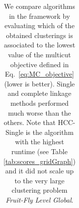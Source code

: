 \begin{table}[t]
\begin{subtable}[t!]{\textwidth}
\begin{tabular}{l | r r r r r r r r r}




        \end{tabular}
    \end{subtable} 
    \caption{We compare algorithms in the \algname{} framework by evaluating which of the obtained clusterings is associated to the lowest value of the multicut objective defined in Eq.~\ref{eq:MC_objective} (lower is better). Single and complete linkage methods performed much worse than the others. Note that HCC-Single is the algorithm with the highest runtime (see Table \ref{tab:scores_gridGraph}) and it did not scale up to the very large clustering problem \emph{Fruit-Fly Level Global}.
    } 
    \label{tab:all_multicut_energies}
\end{table}


